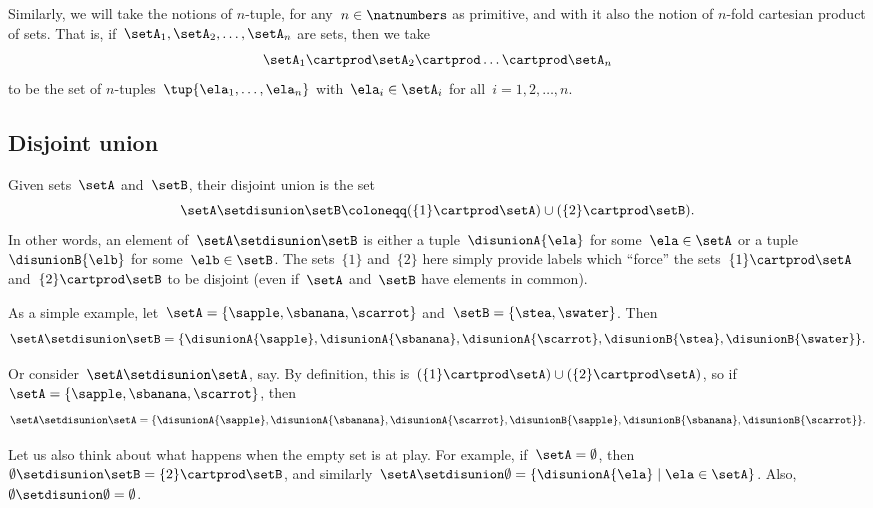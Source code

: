 Similarly, we will take the notions of $n$-tuple, for any~$n \in \natnumbers$ as primitive, and with it also the notion of $n$-fold cartesian product of sets.
That is, if~$\setA_1, \setA_2, \ldots, \setA_n$ are sets, then we take
\begin{equation*}
    \setA_1 \cartprod \setA_2 \cartprod \dots \cartprod \setA_n
\end{equation*}
to be the set of $n$-tuples~$\tup{\ela_1, \ldots, \ela_n}$ with~$\ela_i \in \setA_i$ for all~$i = 1,2,\ldots,n$.

\subsection{Disjoint union}
\label{sec:disjoint-union}

Given sets~$\setA$ and~$\setB$, their disjoint union is the set
\begin{equation*}
    \setA \setdisunion \setB \coloneqq (  \{ 1 \} \cartprod \setA) \cup ( \{2\}  \cartprod \setB).
\end{equation*}
In other words, an element of~$\setA \setdisunion \setB$ is either a tuple~$\disunionA{\ela}$ for some~$\ela \in \setA$ or a tuple $\disunionB{\elb}$ for some~$\elb \in \setB$.
The sets~$\{ 1 \}$ and~$\{2\}$ here simply provide labels which ``force'' the sets~$\{ 1 \}  \cartprod \setA$ and~$ \{2\}  \cartprod \setB$ to be disjoint (even if~$\setA$ and~$\setB$ have elements in common).

As a simple example, let~$\setA = \{ \sapple, \sbanana, \scarrot\}$ and~$\setB = \{ \stea, \swater \}$.
Then
\begin{equation*}
    \setA \setdisunion \setB = \{ \disunionA{\sapple}, \disunionA{\sbanana}, \disunionA{\scarrot}, \disunionB{\stea},  \disunionB{\swater}\}.
\end{equation*}

Or consider~$\setA \setdisunion \setA$, say.
By definition, this is~$(\{ 1 \} \cartprod \setA) \cup (\{2\} \cartprod \setA)$, so if~$\setA = \{ \sapple, \sbanana, \scarrot\}$, then
\begin{equation*}
    \setA \setdisunion \setA = \{ \disunionA{\sapple}, \disunionA{\sbanana}, \disunionA{\scarrot}, \disunionB{\sapple}, \disunionB{\sbanana}, \disunionB{\scarrot} \}.
\end{equation*}

Let us also think about what happens when the empty set is at play.
For example, if~$\setA = \emptyset$, then~$\emptyset \setdisunion \setB =  \{2\} \cartprod \setB$, and similarly~$\setA \setdisunion \emptyset =  \{ \disunionA{\ela} \mid \ela \in \setA \}$.
Also,~$\emptyset \setdisunion \emptyset = \emptyset$.

